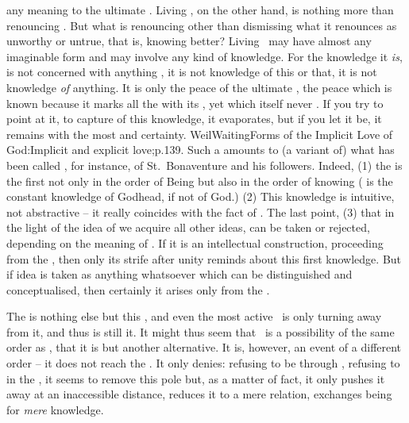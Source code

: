 any meaning to the ultimate . Living \Yes, on the other hand,
is nothing more than renouncing \No. But what is renouncing other than
dismissing what it renounces as unworthy or untrue, that is, knowing better?
Living \Yes\ may have almost any imaginable  form and may involve any
kind of  knowledge. For the knowledge it {\em is}, is not concerned
with anything , it is not knowledge of this or that, it is not
knowledge {\em of} anything. It is only the  peace of the ultimate
, the peace which is known because it marks all the
 with its , yet which itself never
. If you try to point at it, to capture  of this
knowledge, it evaporates, but if you let it be, it remains with the most
 and  certainty. \citet{In what concerns divine
  things, belief is not fitting. Only certainty will do. Anything less than
  certainty is unworthy of God.}{WeilWaiting}{Forms of the Implicit Love of
  God:Implicit and explicit love;p.139. Such a  amounts
  to (a variant of) what has been called , for instance, of
  St.~Bonaventure and his followers. Indeed, (1) the  is the first
  not only in the order of Being but also in the order of knowing (
  is the constant knowledge of Godhead, if not of God.)   (2) This knowledge is intuitive, not abstractive -- it really
  coincides with the fact of . The last point, (3) that in the
  light of the idea of  we acquire all other ideas, can be taken or
  rejected, depending on the meaning of . If it is an intellectual
  construction, proceeding from the , then only its
  strife after unity reminds about this first knowledge. But if idea is taken as
  anything whatsoever which can be distinguished and conceptualised, then
  certainly it arises only from the . }

\newp 
{}
The  is nothing else but this ,
and even the most active \No\ is only turning away from it, and thus is still
 it.  It might thus seem that \No\ is a possibility of the same
order as \Yes, that it is but another alternative. It is, however, an event of a
different order -- it does not reach the .  It only denies:
refusing to be through , refusing to  in the
, it seems to remove this  pole but, as a matter of
fact, it only pushes it away at an inaccessible distance, reduces it to a mere
relation, exchanges being for {\em mere} knowledge.
  

